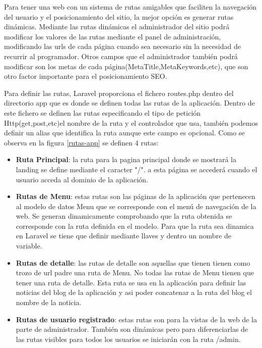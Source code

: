 Para tener una web con un sistema de rutas amigables que faciliten la navegación del usuario y el posicionamiento del sitio, la mejor opción es generar rutas dinámicas. Mediante las rutas dinámicas el administrador del sitio podrá modificar los valores de las rutas mediante el panel de administración, modificando las urls de cada página cuando sea necesario sin la necesidad de recurrir al programador. Otros campos que el administrador también podrá modificar son los metas de cada página(MetaTitle,MetaKeywords,etc), que son otro factor importante para el posicionamiento SEO.

\vspace{5 mm}

Para definir las rutas, Laravel proporciona el fichero routes.php dentro del directorio app que es donde se definen todas las rutas de la aplicación. Dentro de este fichero se definen las rutas especificando el tipo de petición Http(get,post,etc)el nombre de la ruta y el controlador que usa, también podemos definir un alias que identifica la ruta aunque este campo es opcional. Como se observa en la figura \ref{rutas-app} se definen 4 rutas:

\begin{itemize}

\item \textbf{Ruta Principal}: la ruta para la pagina principal donde se mostrará la landing se define mediante el caracter "/". a esta página se accederá cuando el usuario acceda al dominio de la aplicación.

\item \textbf{Rutas de Menu}: estas rutas son las páginas de la aplicación que pertenecen al modelo de datos Menu que se corresponde con el menú de navegación de la web. Se generan dinamicamente comprobando que la ruta obtenida se corresponde con la ruta definida en el modelo. Para que la ruta sea dinamica en Laravel se tiene que definir mediante llaves y dentro un nombre de variable.

\item \textbf{Rutas de detalle}: las rutas de detalle son aquellas que tienen tienen como trozo de url padre una ruta de Menu. No todas las rutas de Menu tienen que tener una ruta de detalle. Esta ruta se usa en la aplicación para definir las noticias del blog de la aplicación y asi poder concatenar a la ruta del blog el nombre de la noticia.

\item \textbf{Rutas de usuario registrado}: estas rutas son para la vistas de la web de la parte de administrador. También son dinámicas pero para diferenciarlas de las rutas visibles para todos los usuarios se iniciarán con la ruta /admin.

\end{itemize}



